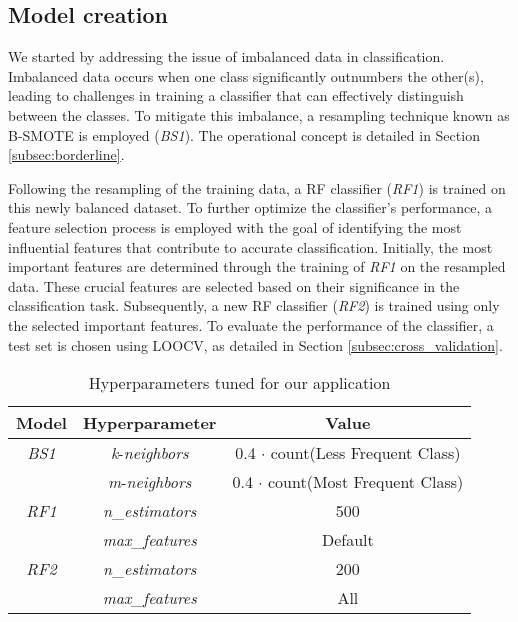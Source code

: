 \subsection{Model creation}
We started by addressing the issue of imbalanced data in classification. Imbalanced data occurs when one class significantly outnumbers the other(s), leading to challenges in training a classifier that can effectively distinguish between the classes.
To mitigate this imbalance, a resampling technique known as B-SMOTE is employed (\textit{BS1}). The operational concept is detailed in Section \ref{subsec:borderline}.

Following the resampling of the training data, a RF classifier (\textit{RF1}) is trained on this newly balanced dataset.
To further optimize the classifier's performance, a feature selection process is employed with the goal of identifying the most influential features that contribute to accurate classification.
Initially, the most important features are determined through the training of \textit{RF1} on the resampled data. 
These crucial features are selected based on their significance in the classification task. 
Subsequently, a new RF classifier (\textit{RF2}) is trained using only the selected important features. 
To evaluate the performance of the classifier, a test set is chosen using LOOCV, as detailed in Section \ref{subsec:cross_validation}. 

\begin{table}[H]
    \centering
    \begin{tabular}{|c|c|c|}
    \hline
    \textbf{Model} & \textbf{Hyperparameter} & \textbf{Value} \\
    \hline
    \textit{BS1} & \textit{k}-\textit{neighbors} & 0.4 $\cdot$ count(Less Frequent Class)  \\
    & \textit{m}-\textit{neighbors} & 0.4 $\cdot$ count(Most Frequent Class)  \\
    \hline
    \textit{RF1} & \textit{n}\_\textit{estimators} & 500  \\
    & \textit{max}\_\textit{features} & Default  \\
    \hline
    \textit{RF2} & \textit{n}\_\textit{estimators} & 200  \\
    & \textit{max}\_\textit{features} & All  \\
    \hline
    \end{tabular}
    \caption{Hyperparameters tuned for our application}
    \label{tab:ml_param}
\end{table}

